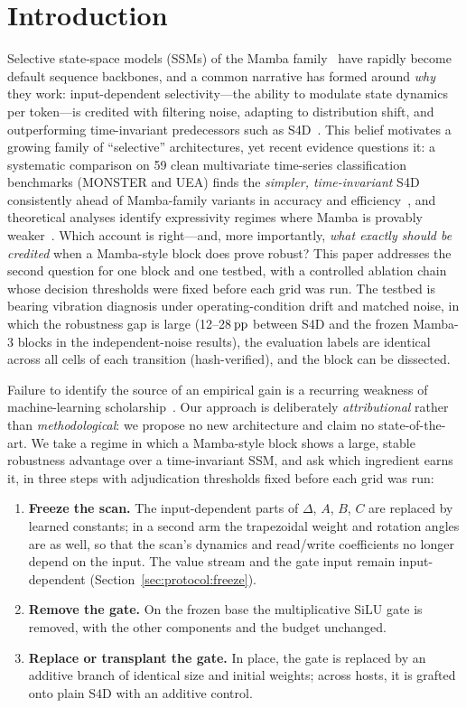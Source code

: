 \section{Introduction}
\label{sec:intro}

Selective state-space models (SSMs) of the Mamba family~\cite{gu2023mamba,qu2024mambasurvey,patro2024mamba360} have rapidly become default sequence backbones, and a common narrative has formed around \emph{why} they work: input-dependent selectivity---the ability to modulate state dynamics per token---is credited with filtering noise, adapting to distribution shift, and outperforming time-invariant predecessors such as S4D~\cite{gu2022s4d}. This belief motivates a growing family of ``selective'' architectures, yet recent evidence questions it: a systematic comparison on 59 clean multivariate time-series classification benchmarks (MONSTER and UEA) finds the \emph{simpler, time-invariant} S4D consistently ahead of Mamba-family variants in accuracy and efficiency~\cite{saadatmand2026s4d}, and theoretical analyses identify expressivity regimes where Mamba is provably weaker~\cite{yu2025blockbiased}. Which account is right---and, more importantly, \emph{what exactly should be credited} when a Mamba-style block does prove robust? This paper addresses the second question for one block and one testbed, with a controlled ablation chain whose decision thresholds were fixed before each grid was run. The testbed is bearing vibration diagnosis under operating-condition drift and matched noise, in which the robustness gap is large (12--28$\,\mathrm{pp}$ between S4D and the frozen Mamba-3 blocks in the independent-noise results), the evaluation labels are identical across all cells of each transition (hash-verified), and the block can be dissected.

Failure to identify the source of an empirical gain is a recurring weakness of machine-learning scholarship~\cite{lipton2018troubling}. Our approach is deliberately \emph{attributional} rather than \emph{methodological}: we propose no new architecture and claim no state-of-the-art. We take a regime in which a Mamba-style block shows a large, stable robustness advantage over a time-invariant SSM, and ask which ingredient earns it, in three steps with adjudication thresholds fixed before each grid was run:

\begin{enumerate}
\item \textbf{Freeze the scan.} The input-dependent parts of $\Delta$, $A$, $B$, $C$ are replaced by learned constants; in a second arm the trapezoidal weight and rotation angles are as well, so that the scan's dynamics and read/write coefficients no longer depend on the input. The value stream and the gate input remain input-dependent (Section~\ref{sec:protocol:freeze}).
\item \textbf{Remove the gate.} On the frozen base the multiplicative SiLU gate is removed, with the other components and the budget unchanged.
\item \textbf{Replace or transplant the gate.} In place, the gate is replaced by an additive branch of identical size and initial weights; across hosts, it is grafted onto plain S4D with an additive control.
\end{enumerate}

